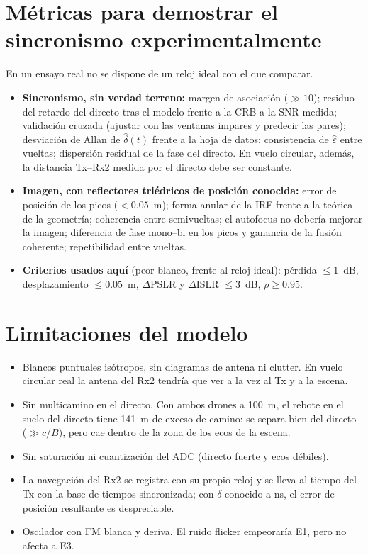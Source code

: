 \documentclass[11pt,a4paper]{article}
\begin{document}
\section{Métricas para demostrar el sincronismo experimentalmente}
\label{sec:exp}

En un ensayo real no se dispone de un reloj ideal con el que comparar.
\begin{itemize}
\item \textbf{Sincronismo, sin verdad terreno:} margen de asociación ($\gg10$);
  residuo del retardo del directo tras el modelo frente a la CRB a la SNR
  medida; validación cruzada (ajustar con las ventanas impares y predecir las
  pares); desviación de Allan de $\hat\delta(t)$ frente a la hoja de datos;
  consistencia de $\hat\varepsilon$ entre vueltas; dispersión residual de la
  fase del directo. En vuelo circular, además, la distancia Tx--Rx2 medida
  por el directo debe ser constante.
\item \textbf{Imagen, con reflectores triédricos de posición conocida:} error
  de posición de los picos ($<0.05$~m); forma anular de la IRF frente a la
  teórica de la geometría; coherencia entre semivueltas; el autofocus no
  debería mejorar la imagen; diferencia de fase mono--bi en los picos y
  ganancia de la fusión coherente; repetibilidad entre vueltas.
\item \textbf{Criterios usados aquí} (peor blanco, frente al reloj ideal):
  pérdida $\le1$~dB, desplazamiento $\le0.05$~m, $\Delta$PSLR y
  $\Delta$ISLR $\le3$~dB, $\rho\ge0.95$.
\end{itemize}

\section{Limitaciones del modelo}
\label{sec:lim}

\begin{itemize}
\item Blancos puntuales isótropos, sin diagramas de antena ni clutter. En
  vuelo circular real la antena del Rx2 tendría que ver a la vez al Tx y a la
  escena.
\item Sin multicamino en el directo. Con ambos drones a 100~m, el rebote en
  el suelo del directo tiene 141~m de exceso de camino: se separa bien del
  directo ($\gg c/B$), pero cae dentro de la zona de los ecos de la escena.
\item Sin saturación ni cuantización del ADC (directo fuerte y ecos débiles).
\item La navegación del Rx2 se registra con su propio reloj y se lleva al
  tiempo del Tx con la base de tiempos sincronizada; con $\delta$ conocido a
  ns, el error de posición resultante es despreciable.
\item Oscilador con FM blanca y deriva. El ruido flicker empeoraría E1, pero
  no afecta a E3.
\end{itemize}
\end{document}
